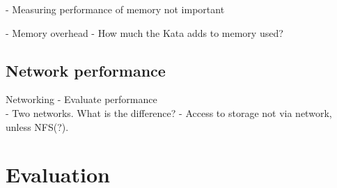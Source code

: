 - Measuring performance of memory not important

- Memory overhead
	- How much the Kata adds to memory used?

\subsection{Network performance}

Networking
    - Evaluate performance \\
    - Two networks. What is the difference?
    - Access to storage not via network, unless NFS(?).

\section{Evaluation}